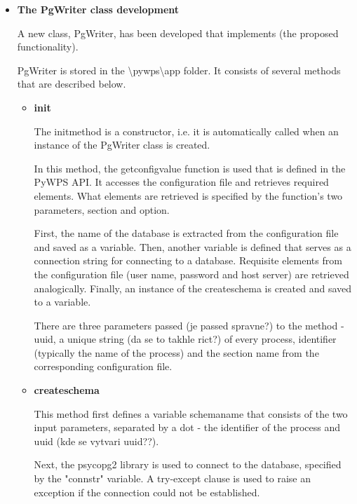 \begin{itemize}

\item \textbf{The PgWriter class development}

A new class, PgWriter, has been developed that implements (the proposed functionality).

PgWriter is stored in the \textbackslash pywps\textbackslash app folder. It consists of several methods that are described below. 



\begin{itemize}
\item \textbf{\textunderscore \textunderscore init\textunderscore \textunderscore }

The \textunderscore \textunderscore init\textunderscore \textunderscore  method is a constructor, i.e. it is automatically called when an instance of the PgWriter class is created. 

In this method, the get\textunderscore config\textunderscore value function is used that is defined in the PyWPS API. It accesses the configuration file and retrieves required elements. What elements are retrieved is specified by the function's two parameters, section and option.

First, the name of the database is extracted from the configuration file and saved as a variable. Then, another variable is defined that serves as a connection string for connecting to a database. Requisite elements from the configuration file (user name, password and host server) are retrieved analogically. Finally, an instance of the create\textunderscore schema is created and saved to a variable.

There are three parameters passed (je passed spravne?) to the method - uuid, a unique string (da se to takhle rict?) of every process, identifier (typically the name of the process) and the section name from the corresponding configuration file.


\item \textbf{create\textunderscore schema}

This method first defines a variable schema\textunderscore name that consists of the two input parameters, separated by a dot - the identifier of the process and uuid (kde se vytvari uuid??).

Next, the psycopg2 library is used to connect to the database, specified by the "connstr" variable. A try-except clause is used to raise an exception if the connection could not be established. 


\end{itemize}
\end{itemize}
